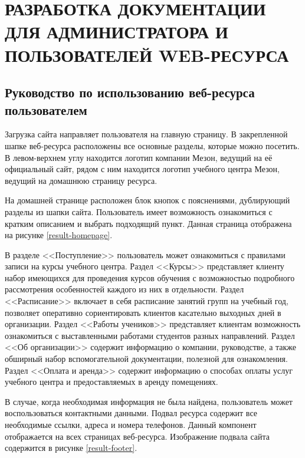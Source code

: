 \section{РАЗРАБОТКА ДОКУМЕНТАЦИИ ДЛЯ АДМИНИСТРАТОРА И ПОЛЬЗОВАТЕЛЕЙ WEB-РЕСУРСА}

\subsection{Руководство по использованию веб-ресурса пользователем}

Загрузка сайта направляет пользователя на главную страницу.
В закрепленной шапке веб-ресурса расположены все основные разделы, которые можно посетить.
В левом-верхнем углу находится логотип компании Мезон, ведущий на её официальный сайт, рядом с ним находится логотип учебного центра Мезон, ведущий на домашнюю страницу ресурса.

На домашней странице расположен блок кнопок с пояснениями, дублирующий разделы из шапки сайта.
Пользователь имеет возможность ознакомиться с кратким описанием и выбрать подходящий пункт.
Данная страница отображена на рисунке \ref{result-homepage}.


В разделе <<Поступление>> пользователь может ознакомиться с правилами записи на курсы учебного центра.
Раздел <<Курсы>> представляет клиенту набор имеющихся для проведения курсов обучения с возможностью подробного рассмотрения особенностей каждого из них в отдельности.
Раздел <<Расписание>> включает в себя расписание занятий групп на учебный год, позволяет оперативно сориентировать клиентов касательно выходных дней в организации.
Раздел <<Работы учеников>> представляет клиентам возможность ознакомиться с выставленными работами студентов разных направлений.
Раздел <<Об организации>> содержит информацию о компании, руководстве, а также обширный набор вспомогательной документации, полезной для ознакомления.
Раздел <<Оплата и аренда>> содержит информацию о способах оплаты услуг учебного центра и предоставляемых в аренду помещениях.

В случае, когда необходимая информация не была найдена, пользователь может воспользоваться контактными данными.
Подвал ресурса содержит все необходимые ссылки, адреса и номера телефонов.
Данный компонент отображается на всех страницах веб-ресурса.
Изображение подвала сайта содержится в рисунке \ref{result-footer}.

